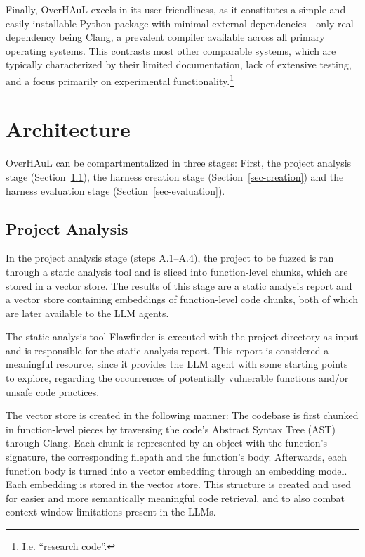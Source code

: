 \documentclass[
  a4paper,
  DIV=11,
  numbers=noendperiod]{scrreprt}
\theoremstyle{definition}
\theoremstyle{remark}
\begin{document}
Finally, OverHAuL excels in its user-friendliness, as it constitutes a
simple and easily-installable Python package with minimal external
dependencies---only real dependency being Clang, a prevalent compiler
available across all primary operating systems. This contrasts most
other comparable systems, which are typically characterized by their
limited documentation, lack of extensive testing, and a focus primarily
on experimental functionality.\footnote{I.e. ``research code''.}

\section{Architecture}\label{sec-architecture}

OverHAuL can be compartmentalized in three stages: First, the project
analysis stage (Section~\ref{sec-analysis}), the harness creation stage
(Section~\ref{sec-creation}) and the harness evaluation stage
(Section~\ref{sec-evaluation}).

\subsection{Project Analysis}\label{sec-analysis}

In the project analysis stage (steps A.1--A.4), the project to be fuzzed
is ran through a static analysis tool and is sliced into function-level
chunks, which are stored in a vector store. The results of this stage
are a static analysis report and a vector store containing embeddings of
function-level code chunks, both of which are later available to the LLM
agents.

The static analysis tool Flawfinder \autocite{flawfinder} is executed
with the project directory as input and is responsible for the static
analysis report. This report is considered a meaningful resource, since
it provides the LLM agent with some starting points to explore,
regarding the occurrences of potentially vulnerable functions and/or
unsafe code practices.

The vector store is created in the following manner: The codebase is
first chunked in function-level pieces by traversing the code's Abstract
Syntax Tree (AST) through Clang. Each chunk is represented by an object
with the function's signature, the corresponding filepath and the
function's body. Afterwards, each function body is turned into a vector
embedding through an embedding model. Each embedding is stored in the
vector store. This structure is created and used for easier and more
semantically meaningful code retrieval, and to also combat context
window limitations present in the LLMs.
\end{document}
